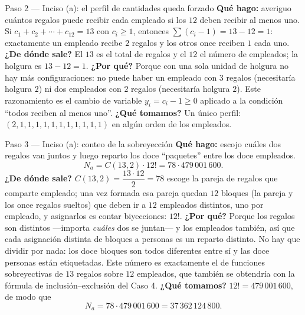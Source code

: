 \documentclass[11pt]{article}
\begin{document}
\begin{paso}{Paso 2 --- Inciso (a): el perfil de cantidades queda forzado}
\textbf{Qué hago:} averiguo cuántos regalos puede recibir cada empleado si los $12$ deben recibir al menos uno.
Si $c_1+c_2+\cdots+c_{12}=13$ con $c_i\ge 1$, entonces $\sum(c_i-1)=13-12=1$: exactamente un empleado recibe $2$ regalos y los otros once reciben $1$ cada uno.
\textbf{¿De dónde sale?} El $13$ es el total de regalos y el $12$ el número de empleados; la holgura es $13-12=1$.
\textbf{¿Por qué?} Porque con una sola unidad de holgura no hay más configuraciones: no puede haber un empleado con $3$ regalos (necesitaría holgura $2$) ni dos empleados con $2$ regalos (necesitaría holgura $2$). Este razonamiento es el cambio de variable $y_i=c_i-1\ge0$ aplicado a la condición ``todos reciben al menos uno''.
\textbf{¿Qué tomamos?} Un único perfil: $(2,1,1,1,1,1,1,1,1,1,1,1)$ en algún orden de los empleados.
\end{paso}

\begin{paso}{Paso 3 --- Inciso (a): conteo de la sobreyección}
\textbf{Qué hago:} escojo cuáles dos regalos van juntos y luego reparto los doce ``paquetes'' entre los doce empleados.
\[
N_a=C(13,2)\cdot 12!=78\cdot 479\,001\,600 .
\]
\textbf{¿De dónde sale?} $C(13,2)=\dfrac{13\cdot12}{2}=78$ escoge la pareja de regalos que comparte empleado; una vez formada esa pareja quedan $12$ bloques (la pareja y los once regalos sueltos) que deben ir a $12$ empleados distintos, uno por empleado, y asignarlos es contar biyecciones: $12!$.
\textbf{¿Por qué?} Porque los regalos son distintos —importa \emph{cuáles} dos se juntan— y los empleados también, así que cada asignación distinta de bloques a personas es un reparto distinto. No hay que dividir por nada: los doce bloques son todos diferentes entre sí y las doce personas están etiquetadas. Este número es exactamente el de funciones sobreyectivas de $13$ regalos sobre $12$ empleados, que también se obtendría con la fórmula de inclusión--exclusión del Caso 4.
\textbf{¿Qué tomamos?} $12!=479\,001\,600$, de modo que
\[
N_a=78\cdot 479\,001\,600=37\,362\,124\,800 .
\]
\end{paso}
\end{document}
